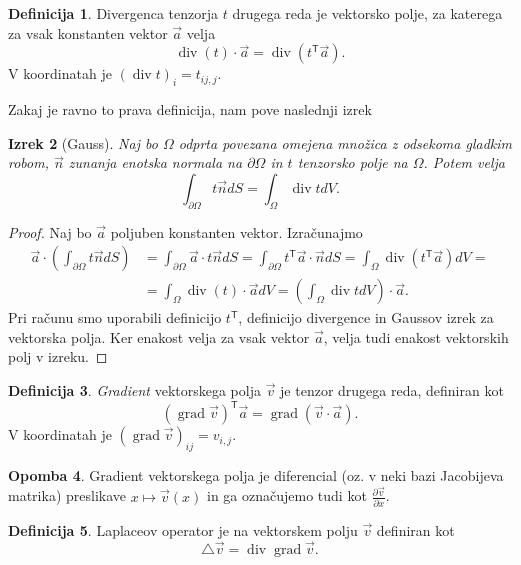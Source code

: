 \documentclass[12pt,a4paper,twoside]{article}
\theoremstyle{definition} %
\newtheorem{definicija}{Definicija}[section]
\newtheorem{opomba}[definicija]{Opomba}
\theoremstyle{plain} %
\newtheorem{izrek}[definicija]{Izrek}
\numberwithin{equation}{section}
\newcommand{\T}{\mathsf{T}}
\newcommand{\lap}{\triangle}
\renewcommand{\div}{\operatorname{div}}
\newcommand{\grad}{\operatorname{grad}}
\newcommand{\dpar}[2]{\ensuremath{\frac{\partial #1}{\partial #2}}}
\newcommand{\vv}{\vec{v}}
\newcommand{\va}{\vec{a}}
\newcommand{\vn}{\vec{n}}
\newcommand{\vx}{x}
\begin{document}
\begin{definicija}
  Divergenca tenzorja $t$ drugega reda je vektorsko polje, za katerega za vsak
  konstanten vektor $\va$ velja
  \[ \div(t)\cdot \va = \div(t^\T \va). \]
  V koordinatah je $(\div t)_i = t_{ij,j}$.
\end{definicija}

Zakaj je ravno to prava definicija, nam pove naslednji izrek
\begin{izrek}[Gauss]
  \label{izr:gauss}
  Naj bo $\Omega$ odprta povezana omejena množica z odsekoma gladkim robom, $\vn$ zunanja enotska
  normala na $\partial \Omega$ in $t$ tenzorsko polje na $\Omega$.  Potem velja
  \[
    \int_{\partial \Omega} t\vn dS = \int_{\Omega} \div t dV.
  \]
\end{izrek}
\begin{proof}
Naj bo $\va$ poljuben konstanten vektor. Izračunajmo
\begin{align*}
  \va \cdot \left( \int_{\partial \Omega} t\vn dS \right) &=
  \int_{\partial \Omega}\va \cdot t\vn dS =
  \int_{\partial \Omega}t^\T \va \cdot \vn dS =
  \int_{\Omega}\div(t^\T \va) dV = \\ &=
  \int_{\Omega}\div(t) \cdot \va dV =
  \left(\int_{\Omega}\div t dV\right) \cdot \va.
\end{align*}
Pri računu smo uporabili definicijo $t^\T$, definicijo divergence in Gaussov
izrek za vektorska polja. Ker enakost velja za vsak vektor $\va$, velja tudi
enakost vektorskih polj v izreku.
\end{proof}

\begin{definicija}
  \emph{Gradient} vektorskega polja $\vv$ je tenzor drugega reda, definiran kot
  \[
    (\grad\vv)^\T \va = \grad(\vv\cdot\va).
  \]
  V koordinatah je $(\grad\vv)_{ij} = v_{i,j}$.
\end{definicija}
\begin{opomba}
  Gradient vektorskega polja je diferencial (oz. v neki bazi Jacobijeva matrika)
  preslikave $\vx \mapsto \vv(\vx)$ in ga označujemo tudi kot $\dpar{\vv}{\vx}$.
\end{opomba}

\begin{definicija}
  Laplaceov operator je na vektorskem polju $\vv$ definiran kot
  \[ \lap \vv = \div\grad \vv.  \]
\end{definicija}
\end{document}
